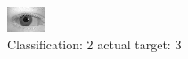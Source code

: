 \begin{figure}[h!]
\begin{center}
\includegraphics[width=0.60\columnwidth]{figures/ID657_class_2_target_3.png}
\end{center}
\caption{ Classification: 2 actual target: 3}
\label{fig:ID657_class_2_target_3}
\end{figure}
